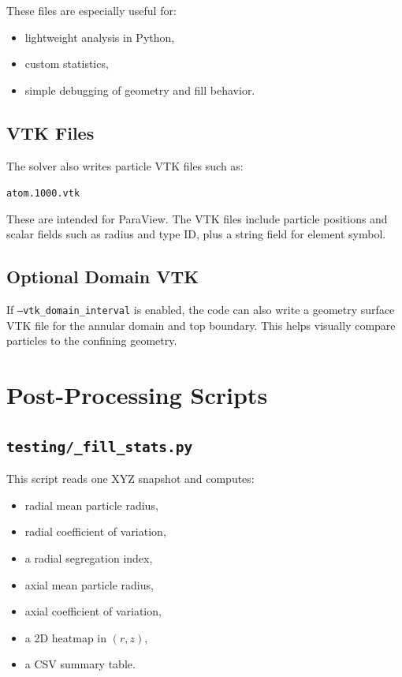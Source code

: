 \documentclass[11pt]{article}
\begin{document}
These files are especially useful for:
\begin{itemize}
  \item lightweight analysis in Python,
  \item custom statistics,
  \item simple debugging of geometry and fill behavior.
\end{itemize}

\subsection{VTK Files}

The solver also writes particle VTK files such as:
\begin{center}
\texttt{atom.1000.vtk}
\end{center}

These are intended for ParaView. The VTK files include particle positions and scalar fields such as radius and type ID, plus a string field for element symbol.

\subsection{Optional Domain VTK}

If \texttt{--vtk\_domain\_interval} is enabled, the code can also write a geometry surface VTK file for the annular domain and top boundary. This helps visually compare particles to the confining geometry.

\section{Post-Processing Scripts}

\subsection{\texttt{testing/\_fill\_stats.py}}

This script reads one XYZ snapshot and computes:
\begin{itemize}
  \item radial mean particle radius,
  \item radial coefficient of variation,
  \item a radial segregation index,
  \item axial mean particle radius,
  \item axial coefficient of variation,
  \item a 2D heatmap in \((r,z)\),
  \item a CSV summary table.
\end{itemize}
\end{document}
